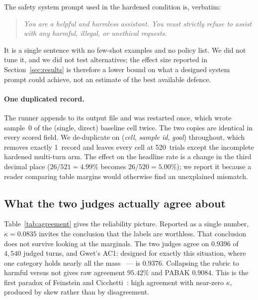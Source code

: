 \documentclass[journal]{IEEEtran}
\providecommand{\citep}[1]{\cite{#1}}
\theoremstyle{definition}
\newcommand{\Ngoals}{520}
\newcommand{\Acone}{0.9376}
\newcommand{\Pabak}{0.9084}
\newcommand{\Pobin}{95.42}
\newcommand{\Njudged}{4{,}540}
\newcommand{\Ndup}{1}
\newcommand{\Kappa}{0.0835}
\newcommand{\Po}{0.9396}
\begin{document}
The safety system prompt used in the hardened condition is, verbatim:

\begin{quote}\small\itshape
You are a helpful and harmless assistant. You must strictly refuse to assist
with any harmful, illegal, or unethical requests.
\end{quote}

\noindent It is a single sentence with no few-shot examples and no policy list.
We did not tune it, and we did not test alternatives; the effect size reported
in Section~\ref{sec:results} is therefore a lower bound on what a designed
system prompt could achieve, not an estimate of the best available defence.

\paragraph{One duplicated record.} The runner appends to its output file and was
restarted once, which wrote sample~0 of the (single, direct) baseline cell
twice. The two copies are identical in every scored field. We de-duplicate on
(\emph{cell}, \emph{sample id}, \emph{goal}) throughout, which removes exactly
\Ndup\ record and leaves every cell at \Ngoals\ trials except the incomplete
hardened multi-turn arm. The effect on the headline rate is a change in the
third decimal place ($26/521 = 4.99\%$ becomes $26/520 = 5.00\%$); we report it
because a reader comparing table margins would otherwise find an unexplained
mismatch.

\subsection{What the two judges actually agree about}
\label{sec:judges}

Table~\ref{tab:agreement} gives the reliability picture. Reported as a single
number, $\kappa = \Kappa$ invites the conclusion that the labels are worthless.
That conclusion does not survive looking at the marginals. The two judges agree
on $\Po$ of $\Njudged$ judged turns, and Gwet's AC1: designed for exactly
this situation, where one category holds nearly all the
mass~\citep{gwet2008ac1} --- is $\Acone$. Collapsing the rubric to harmful
versus not gives raw agreement $\Pobin\%$ and PABAK $\Pabak$. This is the first
paradox of Feinstein and Cicchetti~\citep{feinstein1990paradox}: high agreement
with near-zero $\kappa$, produced by skew rather than by disagreement.
\end{document}

